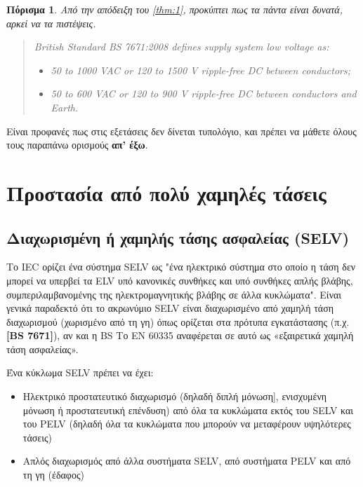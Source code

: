\documentclass[11pt,a4paper,notitlepage,fleqn]{article}
\newtheorem{cor}[thm]{Πόρισμα}
\begin{document}
\begin{cor}
	Από την απόδειξη του \autoref{thm:1}, προκύπτει πως
	τα πάντα είναι δυνατά, αρκεί να τα πιστέψεις.
\end{cor}

\begin{defn}{}{}
	\begin{quote}
		\textit{    British Standard BS 7671:2008 defines supply system low voltage as:}
			
			\begin{itemize}
\item		\textit{	50 to 1000 VAC or 120 to 1500 V ripple-free DC between conductors;}
\item		\textit{	50 to 600 VAC or 120 to 900 V ripple-free DC between conductors and Earth.}
	   \end{itemize}	

	\end{quote}
\end{defn}

Είναι προφανές πως στις εξετάσεις δεν δίνεται τυπολόγιο, και πρέπει να μάθετε όλους τους παραπάνω ορισμούς \textbf{απ' έξω}.

\section{Προστασία από πολύ χαμηλές τάσεις}
\subsection{Διαχωρισμένη ή χαμηλής τάσης ασφαλείας (\textbf{SELV})}

Το IEC ορίζει ένα σύστημα SELV ως "ένα ηλεκτρικό σύστημα στο οποίο η τάση δεν μπορεί να υπερβεί τα ELV υπό κανονικές συνθήκες και υπό συνθήκες απλής βλάβης, συμπεριλαμβανομένης της ηλεκτρομαγνητικής βλάβης σε άλλα κυκλώματα". Είναι γενικά παραδεκτό ότι το ακρωνύμιο SELV είναι διαχωρισμένο από χαμηλή τάση διαχωρισμού (χωρισμένο από τη γη) όπως ορίζεται στα πρότυπα εγκατάστασης (π.χ. \textbf{[BS 7671]}), αν και η BS Το EN 60335 αναφέρεται σε αυτό ως «εξαιρετικά χαμηλή τάση ασφαλείας».

Ένα κύκλωμα SELV πρέπει να έχει:


\begin{itemize}
	\item   Ηλεκτρικό προστατευτικό διαχωρισμό (δηλαδή διπλή μόνωση], ενισχυμένη μόνωση ή προστατευτική επένδυση) από όλα τα κυκλώματα εκτός του SELV και του PELV (δηλαδή όλα τα κυκλώματα που μπορούν να μεταφέρουν υψηλότερες τάσεις)
	\item     Απλός διαχωρισμός από άλλα συστήματα SELV, από συστήματα PELV και από τη γη (έδαφος)
\end{itemize}
\end{document}

